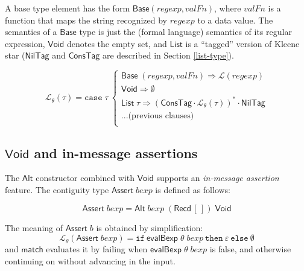 \documentclass[a4paper,UKenglish,cleveref, autoref, thm-restate]{lipics-v2021}
\newcommand{\konst}[1]{\ensuremath{\mathsf{#1}}}
\newcommand{\Lang}[1]{\ensuremath{{\mathcal L}({#1})}}
\newcommand{\LangTheta}[1]{\ensuremath{{\mathcal L}_{\theta}({#1})}}
\newcommand{\itelse}[3]{\mbox{$\mathtt{if}\ {#1}\ \mathtt{then}\ {#2}\ \mathtt{else}\ {#3}$}}
\begin{document}
\begin{definition}

A base type element has the form
$\konst{Base}(\mathit{regexp},\mathit{valFn})$, where $\mathit{valFn}$
is a function that maps the string recognized by $\mathit{regexp}$ to
a data value.  The semantics of a \konst{Base} type is just the
(formal language) semantics of its regular expression, \konst{Void}
denotes the empty set, and \konst{List} is a ``tagged'' version of
Kleene star (\konst{NilTag} and \konst{ConsTag} are described in
Section \ref{list-type}).

\[
\LangTheta{\tau} =
\mathtt{case}\; \tau\
 \left\{
 \begin{array}{l}
 \konst{Base}\; (\mathit{regexp}, \mathit{valFn}) \Rightarrow  \Lang{\mathit{regexp}} \\

 \konst{Void} \Rightarrow  \emptyset \\

 \konst{List}\; \tau \Rightarrow
   (\konst{ConsTag}\cdot \LangTheta{\tau})^{*} \cdot \konst{NilTag} \\

 ... \text{(previous clauses)}  \\

 \end{array}
 \right.
\]
\end{definition}

\subsection{\konst{Void} and in-message assertions}\label{assert}

The \konst{Alt} constructor combined with \konst{Void} supports an
\emph{in-message assertion} feature. The contiguity type
$\konst{Assert}\;\mathit{bexp}$ is defined as follows:

\begin{definition}[\konst{Assert}]

\[
  \konst{Assert}\; \mathit{bexp} =
     \konst{Alt} \; \mathit{bexp} \; (\konst{Recd}\, [\,]) \; \konst{Void}
\]

\end{definition}

\noindent The meaning of $\konst{Assert}\;b$ is obtained by simplification:
%
\[
\LangTheta{\konst{Assert}\; \mathit{bexp}} =
 \itelse{\konst{evalBexp}\;\theta\;\mathit{bexp}}
        {\varepsilon} {\emptyset}
\]
%
and \konst{match} evaluates it by failing when
$\konst{evalBexp}\;\theta\;\mathit{bexp}$ is false, and otherwise
continuing on without advancing in the input.
\end{document}
